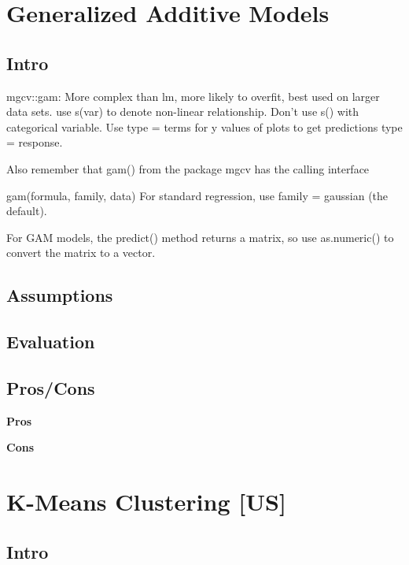 \documentclass[]{book}
\begin{document}
\hypertarget{generalized-additive-models}{%
\section{Generalized Additive Models}\label{generalized-additive-models}}

\hypertarget{intro}{%
\subsection{Intro}\label{intro}}

mgcv::gam: More complex than lm, more likely to overfit, best used on larger data sets. use s(var) to denote non-linear relationship. Don't use s() with categorical variable. Use type = terms for y values of plots to get predictions type = response.

Also remember that gam() from the package mgcv has the calling interface

gam(formula, family, data)
For standard regression, use family = gaussian (the default).

For GAM models, the predict() method returns a matrix, so use as.numeric() to convert the matrix to a vector.

\hypertarget{assumptions}{%
\subsection{Assumptions}\label{assumptions}}

\hypertarget{evaluation}{%
\subsection{Evaluation}\label{evaluation}}

\hypertarget{proscons}{%
\subsection{Pros/Cons}\label{proscons}}

\textbf{Pros}

\textbf{Cons}

\hypertarget{k-means-clustering-us}{%
\section{K-Means Clustering {[}US{]}}\label{k-means-clustering-us}}

\hypertarget{intro-1}{%
\subsection{Intro}\label{intro-1}}
\end{document}
